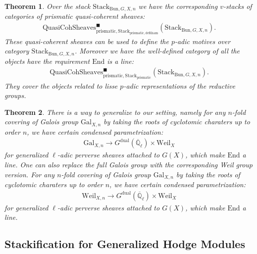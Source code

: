 \documentclass[12pt]{article}
\newtheorem{theorem}{Theorem}
\theoremstyle{definition}
\begin{document}
\begin{theorem}
Over the stack $\mathrm{Stack}_{\mathrm{Bun},G,X,n}$ we have the corresponding $v$-stacks of categories of prismatic quasi-coherent sheaves:
\begin{align}
\mathrm{QuasiCohSheaves}^\blacksquare_{\mathrm{prismatic},\mathrm{Stack}_{\mathrm{prismatic},\mathrm{deRham}}}(\mathrm{Stack}_{\mathrm{Bun},G,X,n}).
\end{align}
These quasi-coherent sheaves can be used to define the $p$-adic motives over category $\mathrm{Stack}_{\mathrm{Bun},G,X,n}$. Moreover we have the well-defined category of all the objects have the requirement $\mathrm{End}$ is a line:
\begin{align}
\mathrm{QuasiCohSheaves}^\blacksquare_{\mathrm{prismatic},\mathrm{Stack}_{\mathrm{prismatic}}}(\mathrm{Stack}_{\mathrm{Bun},G,X,n}).
\end{align}
They cover the objects related to lisse $p$-adic representations of the reductive groups.
\end{theorem}

\begin{theorem}
There is a way to generalize \cite{FS} to our setting, namely for any $n$-fold covering of Galois group $\mathrm{Gal}_{X,n}$ by taking the roots of cyclotomic charaters up to order $n$, we have certain condensed parametrization:
\begin{align}
\mathrm{Gal}_{X,n} \rightarrow G^\mathrm{dual}(\overline{\mathbb{Q}}_\ell)\times \mathrm{Weil}_X
\end{align}
for generalized $\ell$-adic perverse sheaves attached to $G(X)$, which make $\mathrm{End}$ a line. One can also replace the full Galois group with the corresponding Weil group version. For any $n$-fold covering of Galois group $\mathrm{Gal}_{X,n}$ by taking the roots of cyclotomic charaters up to order $n$, we have certain condensed parametrization:
\begin{align}
\mathrm{Weil}_{X,n} \rightarrow G^\mathrm{dual}(\overline{\mathbb{Q}}_\ell)\times \mathrm{Weil}_X
\end{align}
for generalized $\ell$-adic perverse sheaves attached to $G(X)$, which make $\mathrm{End}$ a line. 
\end{theorem}




\subsection{Stackification for Generalized Hodge Modules}
\end{document}
